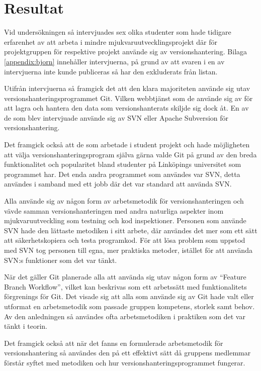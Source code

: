 \section{Resultat}
Vid undersökningen så intervjuades sex olika studenter som hade tidigare erfarenhet av att arbeta i mindre mjukvaruutvecklingsprojekt där för projektgruppen för respektive projekt använde sig av versionshantering. Bilaga \ref{appendix:bjorn} innehåller intervjuerna, på grund av att svaren i en av intervjuerna inte kunde publiceras så har den exkluderats från listan.

Utifrån intervjuerna så framgick det att den klara majoriteten använde sig utav versionshanteringsprogrammet Git. Vilken webbtjänst som de använde sig av för att lagra och hantera den data som versionshanterats skiljde sig dock åt. En av de som blev intervjuade använde sig av SVN eller Apache Subversion för versionshantering.\cite{VersionControlSvn}

Det framgick också att de som arbetade i student projekt och hade möjligheten att välja versionshanteringsprogram själva gärna valde Git på grund av den breda funktionalitet och popularitet bland studenter på Linköpings universitet som programmet har. Det enda andra programmet som användes var SVN, detta användes i samband med ett jobb där det var standard att använda SVN.

Alla använde sig av någon form av arbetsmetodik för versionshanteringen och vävde samman versionshanteringen med andra naturliga aspekter inom mjukvaruutveckling som testning och kod inspektioner. Personen som använde SVN hade den lättaste metodiken i sitt arbete, där användes det mer som ett sätt att säkerhetskopiera och testa programkod. För att lösa problem som uppstod med SVN tog personen till egna, mer praktiska metoder, istället för att använda SVN:s funktioner som det var tänkt.

 När det gäller Git planerade alla att använda sig utav någon form av ``Feature Branch Workflow'', vilket kan beskrivas som ett arbetssätt med funktionalitets förgrenings för Git. Det visade sig att alla som använde sig av Git hade valt eller utformat en arbetsmetodik som passade gruppen kompetens, storlek samt behov. Av den anledningen så användes ofta arbetsmetodiken i praktiken som det var tänkt i teorin.

 Det framgick också att när det fanns en formulerade arbetsmetodik för versionshantering så användes den på ett effektivt sätt då gruppens medlemmar förstår syftet med metodiken och hur versionshanteringsprogrammet fungerar.

